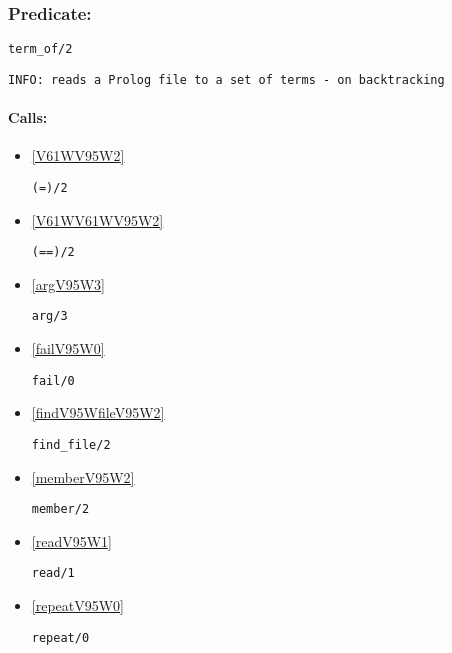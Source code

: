 \subsubsection{Predicate:} \label{termV95WofV95W2}

\begin{verbatim}
term_of/2
\end{verbatim}

{\small \begin{verbatim}
INFO: reads a Prolog file to a set of terms - on backtracking

\end{verbatim}}
\paragraph{Calls:} 
\begin{itemize}
\item \ref{V61WV95W2} 
\begin{verbatim}
(=)/2
\end{verbatim}

\item \ref{V61WV61WV95W2} 
\begin{verbatim}
(==)/2
\end{verbatim}

\item \ref{argV95W3} 
\begin{verbatim}
arg/3
\end{verbatim}

\item \ref{failV95W0} 
\begin{verbatim}
fail/0
\end{verbatim}

\item \ref{findV95WfileV95W2} 
\begin{verbatim}
find_file/2
\end{verbatim}

\item \ref{memberV95W2} 
\begin{verbatim}
member/2
\end{verbatim}

\item \ref{readV95W1} 
\begin{verbatim}
read/1
\end{verbatim}

\item \ref{repeatV95W0} 
\begin{verbatim}
repeat/0
\end{verbatim}


\end{itemize}
